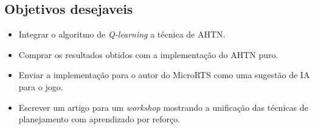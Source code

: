 \subsection{Objetivos desejaveis}
\begin{itemize}
	\item Integrar o algoritmo de \textit{Q-learning} a técnica de AHTN.
	\item Comprar os resultados obtidos com a implementação do AHTN puro.
	\item Enviar a implementação para o autor do MicroRTS como uma sugestão de IA para o jogo.
	\item Escrever um artigo para um \textit{workshop} mostrando a unificação das técnicas de planejamento com aprendizado por reforço.
\end{itemize}

